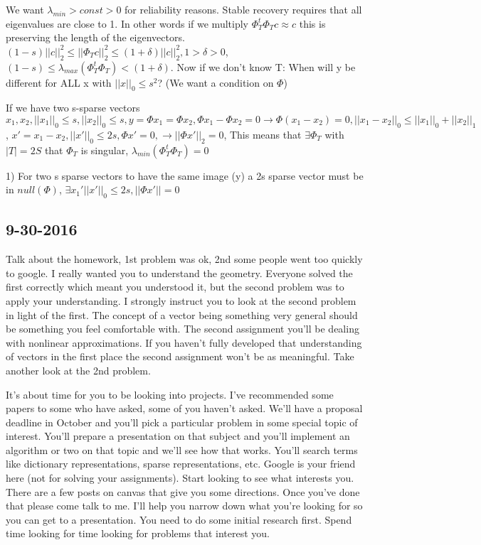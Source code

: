\documentclass[12pt,letterpaper]{report}
\begin{document}
We want $\lambda_{min} > const > 0$ for reliability reasons.  Stable recovery requires that all eigenvalues are close to 1.  In other words if we multiply $\Phi_T^t \Phi_T c \approx c$ this is preserving the length of the eigenvectors.  $(1 - s) ||c||_2^2 \leq ||\Phi_T c||_2^2 \leq (1 + \delta)||c||_2^2, 1 > \delta > 0$, $(1 - s) \leq \lambda_{max}(\Phi_T^t \Phi_T) < (1 + \delta)$.  Now if we don't know T: When will y be different for ALL x with $||x||_0 \leq s^2$? (We want a condition on $\Phi$)

If we have two s-sparse vectors $x_1, x_2, ||x_1||_0 \leq s, ||x_2||_0 \leq s, y = \Phi x_1 = \Phi x_2, \Phi x_1 - \Phi x_2 = 0 \rightarrow \Phi (x_1 - x_2) = 0, ||x_1 - x_2||_0 \leq ||x_1||_0 + ||x_2||_1$, $x' = x_1 - x_2, ||x'||_0 \leq 2s, \Phi x' = 0, \rightarrow ||\Phi x'||_2 = 0$,  This means that $\exists \Phi_T$ with $|T| = 2S$ that $\Phi_T$ is singular, $\lambda_{min}(\Phi_T^t \Phi_T) = 0$

1) For two s sparse vectors to have the same image (y) a 2s sparse vector must be in $null(\Phi)$, $\exists x_1' ||x'||_0 \leq 2s, ||\Phi x'|| = 0$

\subsection*{9-30-2016}

Talk about the homework, 1st problem was ok, 2nd some people went too quickly to google.  I really wanted you to understand the geometry.  Everyone solved the first correctly which meant you understood it, but the second problem was to apply your understanding.  I strongly instruct you to look at the second problem in light of the first.  The concept of a vector being something very general should be something you feel comfortable with.  The second assignment you'll be dealing with nonlinear approximations.  If you haven't fully developed that understanding of vectors in the first place the second assignment won't be as meaningful.  Take another look at the 2nd problem.

It's about time for you to be looking into projects.  I've recommended some papers to some who have asked, some of you haven't asked.  We'll have a proposal deadline in October and you'll pick a particular problem in some special topic of interest.  You'll prepare a presentation on that subject and you'll implement an algorithm or two on that topic and we'll see how that works.  You'll search terms like dictionary representations, sparse representations, etc.  Google is your friend here (not for solving your assignments).  Start looking to see what interests you.  There are a few posts on canvas that give you some directions.  Once you've done that please come talk to me.  I'll help you narrow down what you're looking for so you can get to a presentation.  You need to do some initial research first.  Spend time looking for time looking for problems that interest you.
\end{document}
